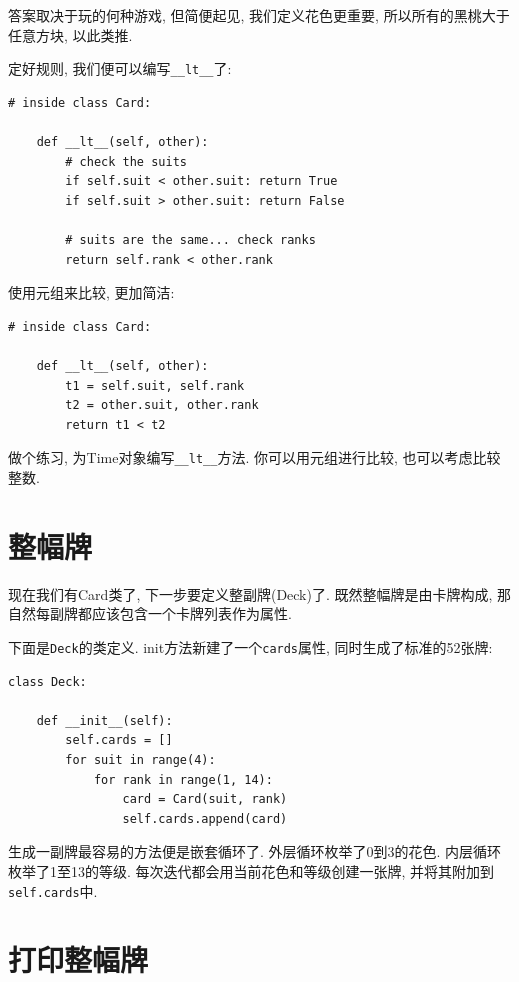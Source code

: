 \documentclass[10pt]{book}
\begin{document}
答案取决于玩的何种游戏,
但简便起见, 我们定义花色更重要, 所以所有的黑桃大于任意方块, 以此类推. 

定好规则, 我们便可以编写\verb"__lt__"了:

\begin{verbatim}
# inside class Card:

    def __lt__(self, other):
        # check the suits
        if self.suit < other.suit: return True
        if self.suit > other.suit: return False

        # suits are the same... check ranks
        return self.rank < other.rank
\end{verbatim}
%
使用元组来比较, 更加简洁:

\begin{verbatim}
# inside class Card:

    def __lt__(self, other):
        t1 = self.suit, self.rank
        t2 = other.suit, other.rank
        return t1 < t2
\end{verbatim}
%
做个练习, 为Time对象编写\verb"__lt__"方法. 
你可以用元组进行比较, 也可以考虑比较整数. 


\section{整幅牌}

现在我们有Card类了, 下一步要定义整副牌(Deck)了. 
既然整幅牌是由卡牌构成, 那自然每副牌都应该包含一个卡牌列表作为属性. 

下面是{\tt Deck}的类定义. 
init方法新建了一个{\tt cards}属性, 
同时生成了标准的52张牌:

\begin{verbatim}
class Deck:

    def __init__(self):
        self.cards = []
        for suit in range(4):
            for rank in range(1, 14):
                card = Card(suit, rank)
                self.cards.append(card)
\end{verbatim}
%
生成一副牌最容易的方法便是嵌套循环了. 
外层循环枚举了0到3的花色. 
内层循环枚举了1至13的等级. 
每次迭代都会用当前花色和等级创建一张牌, 
并将其附加到{\tt self.cards}中. 


\section{打印整幅牌}
\label{printdeck}
\end{document}
